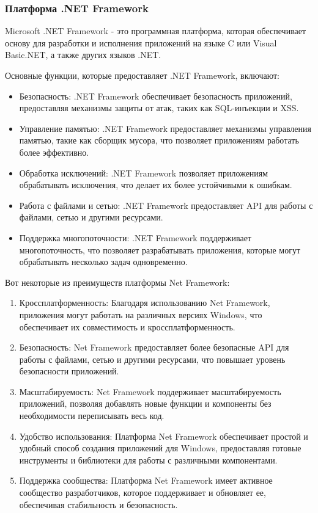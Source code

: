 \documentclass[a4paper,14pt, Times New Roman]{extarticle}
\begin{document}
\subsubsection{Платформа .NET Framework}

Microsoft .NET Framework - это программная платформа, которая обеспечивает основу для разработки и исполнения приложений на языке C или Visual Basic.NET, а также других языков .NET.

Основные функции, которые предоставляет .NET Framework, включают:


\begin{itemize}
  \item Безопасность: .NET Framework обеспечивает безопасность приложений, предоставляя механизмы защиты от атак, таких как SQL-инъекции и XSS.
  \item Управление памятью: .NET Framework предоставляет механизмы управления памятью, такие как сборщик мусора, что позволяет приложениям работать более эффективно.
  \item Обработка исключений: .NET Framework позволяет приложениям обрабатывать исключения, что делает их более устойчивыми к ошибкам.
  \item Работа с файлами и сетью: .NET Framework предоставляет API для работы с файлами, сетью и другими ресурсами.
  \item Поддержка многопоточности: .NET Framework поддерживает многопоточность, что позволяет разрабатывать приложения, которые могут обрабатывать несколько задач одновременно.
\end{itemize}

Вот некоторые из преимуществ платформы Net Framework:

\begin{enumerate}
  \item Кроссплатформенность: Благодаря использованию Net Framework, приложения могут работать на различных версиях Windows, что обеспечивает их совместимость и кроссплатформенность.
  \item Безопасность: Net Framework предоставляет более безопасные API для работы с файлами, сетью и другими ресурсами, что повышает уровень безопасности приложений.
  \item Масштабируемость: Net Framework поддерживает масштабируемость приложений, позволяя добавлять новые функции и компоненты без необходимости переписывать весь код.
  \item Удобство использования: Платформа Net Framework обеспечивает простой и удобный способ создания приложений для Windows, предоставляя готовые инструменты и библиотеки для работы с различными компонентами.
  \item Поддержка сообщества: Платформа Net Framework имеет активное сообщество разработчиков, которое поддерживает и обновляет ее, обеспечивая стабильность и безопасность.
\end{enumerate}
\end{document}
